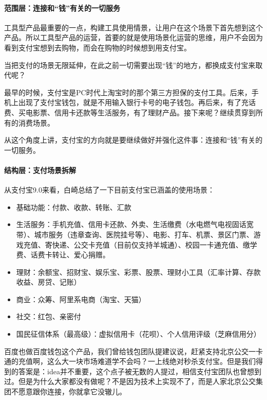 \documentclass[letterpaper,10pt,english]{sphinxmanual}
\begin{document}
\paragraph{范围层：连接和“钱”有关的一切服务}
\label{\detokenize{chapter_AI_company/alipay:id5}}
工具型产品最重要的一点，构建工具使用情景，让用户在这个场景下首先想到这个产品。所以工具型产品的运营，首要的就是使用场景化运营的思维，用户不会因为看到支付宝想到去购物，而会在购物的时候想到用支付宝。

当把支付的场景无限延伸，在此之前一切需要出现“钱”的地方，都换成支付宝来取代呢？

最早的时候，支付宝是PC时代上淘宝时的那个第三方担保的支付工具。后来，手机上出现了支付宝钱包，就是不用输入银行卡号的电子钱包。再后来，有了充话费、买电影票、信用卡还款等生活服务，有了理财产品。接下来呢？继续贯穿到所有的消费场景。

从这个角度上讲，支付宝的方向就是要继续做好并强化这件事：连接和“钱”有关的一切服务。


\paragraph{结构层：支付场景拆解}
\label{\detokenize{chapter_AI_company/alipay:id6}}
从支付宝9.0来看，白崎总结了一下目前支付宝已涵盖的使用场景：
\begin{itemize}
\item {} 
基础功能：付款、收款、转账、汇款

\item {} 
生活服务：手机充值、信用卡还款、外卖、生活缴费（水电燃气电视固话宽带）、城市服务（违章查询、医院挂号等）、电影、打车、机票、景区门票、游戏充值、寄快递、公交卡充值（目前仅支持羊城通）、校园一卡通充值、缴学费、话费卡转让、爱心捐赠。

\item {} 
理财：余额宝、招财宝、娱乐宝、彩票、股票、理财小工具（汇率计算、存款收益、房贷、记账）

\item {} 
商业：众筹、阿里系电商（淘宝、天猫）

\item {} 
社交：红包、亲密付

\item {} 
国民征信体系（最高级）：虚拟信用卡（花呗）、个人信用评级（芝麻信用分）

\end{itemize}

百度也做百度钱包这个产品，我们曾给钱包团队提建议说，赶紧支持北京公交一卡通的充值啊，这么大一块市场难道学不会吗？一上线绝对秒杀支付宝。但是我们得到的答案是：idea并不重要，这个点子被无数的人提过，相信支付宝团队也曾想到过。但是为什么大家都没有做呢？不是因为技术上实现不了，而是人家北京公交集团不愿意跟你连接，你就拿它没辙儿。
\end{document}
